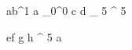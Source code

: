 \begin{eqcode}{a}{b}{^1}{}
  a \gets {}_0^0 \lend
  c \gets d _ 5 ^ 5 \lend
\end{eqcode}


\begin{eqcode}{e}{f}{}{}
  g \gets h ^ 5 \lend
  a  \lend
\end{eqcode}
